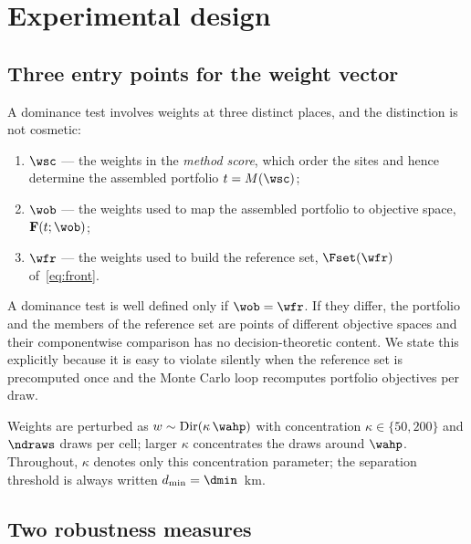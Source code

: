 
\section{Experimental design}
\label{sec:design}

\subsection{Three entry points for the weight vector}

A dominance test involves weights at three distinct places, and the
distinction is not cosmetic:
\begin{enumerate}[label=(\alph*)]
  \item $\wsc$ --- the weights in the \emph{method score}, which order
    the sites and hence determine the assembled portfolio $t=M(\wsc)$;
  \item $\wob$ --- the weights used to map the assembled portfolio to
    objective space, $\mathbf{F}(t;\wob)$;
  \item $\wfr$ --- the weights used to build the reference set,
    $\Fset(\wfr)$ of~\eqref{eq:front}.
\end{enumerate}

\begin{remark}
\label{rem:coherence}
A dominance test is well defined only if $\wob=\wfr$.
If they differ, the portfolio and the members of the reference set are
points of different objective spaces and their componentwise comparison
has no decision-theoretic content.
We state this explicitly because it is easy to violate silently when the
reference set is precomputed once and the Monte Carlo loop recomputes
portfolio objectives per draw.
\end{remark}

Weights are perturbed as $w\sim\mathrm{Dir}(\kappa\,\wahp)$ with
concentration $\kappa\in\{50,200\}$ and $\ndraws$ draws per cell; larger
$\kappa$ concentrates the draws around $\wahp$.
Throughout, $\kappa$ denotes only this concentration parameter; the
separation threshold is always written $d_{\min}=\dmin$~km.

\subsection{Two robustness measures}

